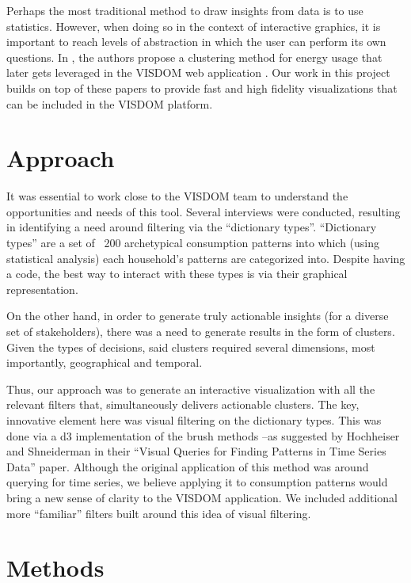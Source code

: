 \documentclass[letterpaper, 12 pt, conference]{ieeeconf}  %
\begin{document}
Perhaps the most traditional method to draw insights from data is to use statistics. However, when doing so in the context of interactive graphics, it is important to reach levels of abstraction in which the user can perform its own questions. In \cite{kwac2014household}, the authors propose a clustering method for energy usage that later gets leveraged in the VISDOM web application \cite{borgeson2015learning}. Our work in this project builds on top of these papers to provide fast and high fidelity visualizations that can be included in the VISDOM platform.

\section{Approach}

It was essential to work close to the VISDOM team to understand the opportunities and needs of this tool. Several interviews were conducted, resulting in identifying a need around filtering via the “dictionary types”. “Dictionary types” are a set of ~200 archetypical consumption patterns into which (using statistical analysis) each household’s patterns are categorized into. Despite having a code, the best way to interact with these types is via their graphical representation.


On the other hand, in order to generate truly actionable insights (for a diverse set of stakeholders), there was a need to generate results in the form of clusters. Given the types of decisions, said clusters required several dimensions, most importantly, geographical and temporal.


Thus, our approach was to generate an interactive visualization with all the relevant filters that, simultaneously delivers actionable clusters. The key, innovative element here was visual filtering on the dictionary types. This was done via a d3 implementation of the brush methods –as suggested by Hochheiser and Shneiderman in their “Visual Queries for Finding Patterns in Time Series Data” paper. Although the original application of this method was around querying for time series, we believe applying it to consumption patterns would bring a new sense of clarity to the VISDOM application. We included additional more “familiar” filters built around this idea of visual filtering.



\section{Methods}
\end{document}
